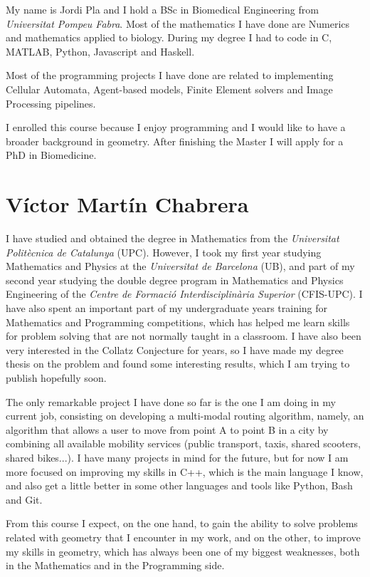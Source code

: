 \documentclass[11pt]{amsart}
\begin{document}
My name is Jordi Pla and I hold a BSc in Biomedical Engineering from
\textit{Universitat Pompeu Fabra}.
Most of the mathematics I have done are Numerics and
mathematics applied to biology.
During my degree I had to code in C, MATLAB, Python, Javascript and Haskell.

Most of the programming projects I have done are related to implementing
Cellular Automata, Agent-based models, Finite Element solvers
and Image Processing pipelines.

I enrolled this course because I enjoy programming
and I would like to have a broader background in geometry.
After finishing the Master I will apply for a PhD in Biomedicine.

\section*{Víctor Martín Chabrera}

I have studied and obtained the degree in Mathematics from the \textit{Universitat Politècnica de Catalunya} (UPC). However, I took my first year studying Mathematics and Physics at the \textit{Universitat de Barcelona} (UB), and part of my second year studying the double degree program in Mathematics and Physics Engineering of the \textit{Centre de Formació Interdisciplinària Superior} (CFIS-UPC). I have also spent an important part of my undergraduate years training for Mathematics and Programming competitions, which has helped me learn skills for problem solving that are not normally taught in a classroom. I have also been very interested in the Collatz Conjecture for years, so I have made my degree thesis on the problem and found some interesting results, which I am trying to publish hopefully soon. 

The only remarkable project I have done so far is the one I am doing in my current job, consisting on developing a multi-modal routing algorithm, namely, an algorithm that allows a user to move from point A to point B in a city by combining all available mobility services (public transport, taxis, shared scooters, shared bikes...). I have many projects in mind for the future, but for now I am more focused on improving my skills in C++, which is the main language I know, and also get a little better in some other languages and tools like Python, Bash and Git.

From this course I expect, on the one hand, to gain the ability to solve problems related with geometry that I encounter in my work, and on the other, to improve my skills in geometry, which has always been one of my biggest weaknesses, both in the Mathematics and in the Programming side.
\end{document}

